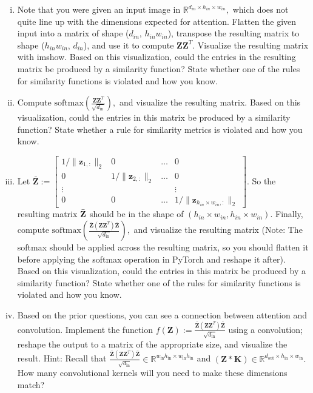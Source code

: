 \documentclass{exam}
\begin{document}
\begin{enumerate}[i.]
    \item Note that you were given an input image in $\mathbb{R}^{d_{in} \times h_{in} \times w_{in}},$ which does not quite line up with the dimensions expected for attention. Flatten the given input into a matrix of shape ($d_{in}$, $h_{in}w_{in}$), transpose the resulting matrix to shape ($h_{in}w_{in}$, $d_{in}$), and use it to compute $\mathbf{Z}\mathbf{Z}^T.$ Visualize the resulting matrix with imshow. Based on this visualization, could the entries in the resulting matrix be produced by a similarity function? State whether one of the rules for similarity functions is violated and how you know.
    \item Compute $\text{softmax} \left( 
    \frac{\mathbf{Z}\mathbf{Z}^T}{\sqrt{d_{\text{in}}}}\right),$ and visualize the resulting matrix. Based on this visualization, could the entries in this matrix be produced by a similarity function? State whether a rule for similarity metrics is violated and how you know.
    \item Let $\bar{\mathbf{Z}}:=\begin{bmatrix}
        1/\|\mathbf{z}_{1, :}\|_2 & 0 & \hdots & 0\\
        0 & 1/\|\mathbf{z}_{2, :}\|_2 & \hdots & 0\\
        \vdots & & & \vdots\\
        0 & 0 & \hdots & 1/\|\mathbf{z}_{ h_{in} \times w_{in}, :}\|_2
    \end{bmatrix}.$ So the resulting matrix $\Bar{\mathbf{Z}}$ should be in the shape of $(h_{in} \times w_{in}, h_{in} \times w_{in})$. Finally, compute $\text{softmax}\left( 
    \frac{\bar{\mathbf{Z}}(\mathbf{Z}\mathbf{Z}^T) \bar{\mathbf{Z}}}{\sqrt{d_{\text{in}}}}\right),$ and visualize the resulting matrix (Note: The softmax should be applied across the resulting matrix, so you should flatten it before applying the softmax operation in PyTorch and reshape it after). Based on this visualization, could the entries in this matrix be produced by a similarity function? State whether one of the rules for similarity functions is violated and how you know.

    \item Based on the prior questions, you can see a connection between attention and convolution. Implement the function $f(\mathbf{Z}) := \frac{\bar{\mathbf{Z}}(\mathbf{Z}\mathbf{Z}^T) \bar{\mathbf{Z}}}{\sqrt{d_{\text{in}}}}$ using a convolution; reshape the output to a matrix of the appropriate size, and visualize the result. Hint: Recall that $
    \frac{\bar{\mathbf{Z}}(\mathbf{Z}\mathbf{Z}^T) \bar{\mathbf{Z}}}{\sqrt{d_{\text{in}}}} \in \mathbb{R}^{w_{\text{in}}h_{\text{in}} \times w_{\text{in}}h_{\text{in}}}$ and $(\mathbf{Z} * \mathbf{K}) \in \mathbb{R}^{d_{\text{out}} \times h_{\text{in}} \times w_{\text{in}}}.$ How many convolutional kernels will you need to make these dimensions match?
\end{enumerate}
\end{document}
